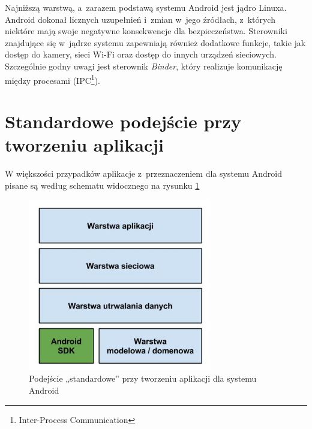 Najniższą warstwą, a~zarazem podstawą systemu Android jest jądro Linuxa. Android dokonał licznych uzupełnień i~zmian w~jego źródłach, z~których niektóre mają swoje negatywne konsekwencje dla bezpieczeństwa. Sterowniki znajdujące się w~jądrze systemu zapewniają również dodatkowe funkcje, takie jak dostęp do kamery, sieci Wi-Fi oraz dostęp do innych urządzeń sieciowych. Szczególnie godny uwagi jest sterownik \textit{Binder}, który realizuje komunikację między procesami\cite{bib:hacker:handbook} (IPC\footnote{Inter-Process Communication}).

\section{Standardowe podejście przy tworzeniu aplikacji}
\label{standardowe_podejscie}
W większości przypadków aplikacje z~przeznaczeniem dla systemu Android pisane są według schematu widocznego na rysunku \ref{fig:opis_problemu}

\begin{figure}[!htb]
    \centering
    \includegraphics[width=8cm]{imgs/ch3_opis_problemu_1.jpg}
    \caption
{Podejście „standardowe” przy tworzeniu aplikacji dla systemu Android}
    \label{fig:opis_problemu}
\end{figure} 

